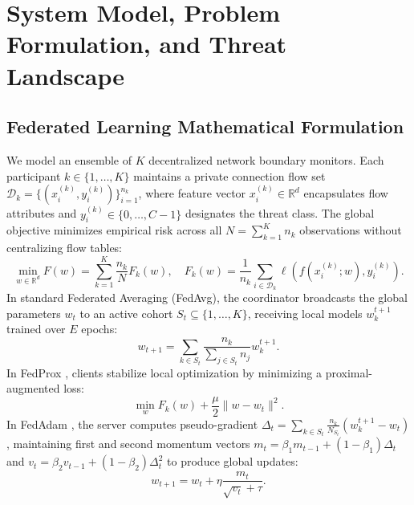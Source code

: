 \documentclass[conference]{IEEEtran}
\begin{document}
\section{System Model, Problem Formulation, and Threat Landscape}
\label{sec:system_model}

\subsection{Federated Learning Mathematical Formulation}
We model an ensemble of $K$ decentralized network boundary monitors. Each participant $k \in \{1, \dots, K\}$ maintains a private connection flow set $\mathcal{D}_k = \{(x_i^{(k)}, y_i^{(k)})\}_{i=1}^{n_k}$, where feature vector $x_i^{(k)} \in \mathbb{R}^d$ encapsulates flow attributes and $y_i^{(k)} \in \{0, \dots, C-1\}$ designates the threat class. The global objective minimizes empirical risk across all $N = \sum_{k=1}^K n_k$ observations without centralizing flow tables:
\begin{equation}
\min_{w \in \mathbb{R}^d} F(w) = \sum_{k=1}^K \frac{n_k}{N} F_k(w), \quad F_k(w) = \frac{1}{n_k} \sum_{i \in \mathcal{D}_k} \ell(f(x_i^{(k)}; w), y_i^{(k)}).
\end{equation}
In standard Federated Averaging (FedAvg), the coordinator broadcasts the global parameters $w_t$ to an active cohort $S_t \subseteq \{1, \dots, K\}$, receiving local models $w_k^{t+1}$ trained over $E$ epochs:
\begin{equation}
w_{t+1} = \sum_{k \in S_t} \frac{n_k}{\sum_{j \in S_t} n_j} w_k^{t+1}.
\end{equation}
In FedProx \cite{li2020federated}, clients stabilize local optimization by minimizing a proximal-augmented loss:
\begin{equation}
\min_{w} F_k(w) + \frac{\mu}{2} \| w - w_t \|^2.
\end{equation}
In FedAdam \cite{reddi2020adaptive}, the server computes pseudo-gradient $\Delta_t = \sum_{k \in S_t} \frac{n_k}{N_{S_t}} (w_k^{t+1} - w_t)$, maintaining first and second momentum vectors $m_t = \beta_1 m_{t-1} + (1 - \beta_1) \Delta_t$ and $v_t = \beta_2 v_{t-1} + (1 - \beta_2) \Delta_t^2$ to produce global updates:
\begin{equation}
w_{t+1} = w_t + \eta \frac{m_t}{\sqrt{v_t} + \tau}.
\end{equation}
\end{document}
